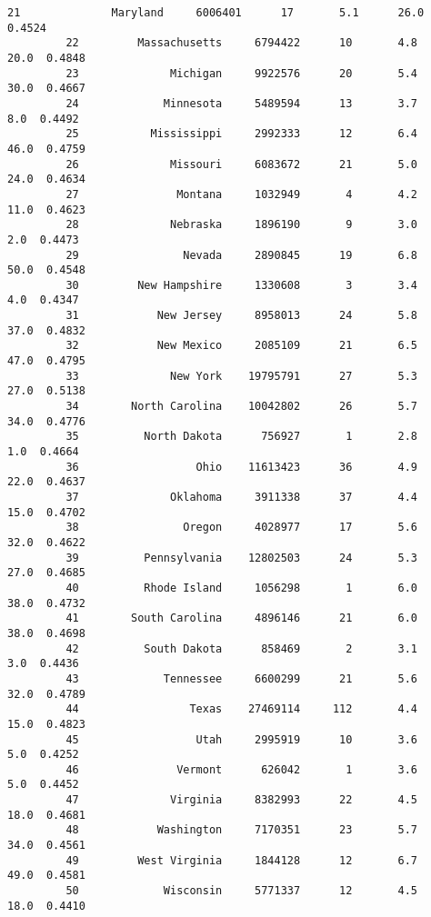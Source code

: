 \documentclass[11pt]{article}
\begin{document}
\begin{Verbatim}[commandchars=\\\{\}]
         21              Maryland     6006401      17       5.1      26.0  0.4524   
         22         Massachusetts     6794422      10       4.8      20.0  0.4848   
         23              Michigan     9922576      20       5.4      30.0  0.4667   
         24             Minnesota     5489594      13       3.7       8.0  0.4492   
         25           Mississippi     2992333      12       6.4      46.0  0.4759   
         26              Missouri     6083672      21       5.0      24.0  0.4634   
         27               Montana     1032949       4       4.2      11.0  0.4623   
         28              Nebraska     1896190       9       3.0       2.0  0.4473   
         29                Nevada     2890845      19       6.8      50.0  0.4548   
         30         New Hampshire     1330608       3       3.4       4.0  0.4347   
         31            New Jersey     8958013      24       5.8      37.0  0.4832   
         32            New Mexico     2085109      21       6.5      47.0  0.4795   
         33              New York    19795791      27       5.3      27.0  0.5138   
         34        North Carolina    10042802      26       5.7      34.0  0.4776   
         35          North Dakota      756927       1       2.8       1.0  0.4664   
         36                  Ohio    11613423      36       4.9      22.0  0.4637   
         37              Oklahoma     3911338      37       4.4      15.0  0.4702   
         38                Oregon     4028977      17       5.6      32.0  0.4622   
         39          Pennsylvania    12802503      24       5.3      27.0  0.4685   
         40          Rhode Island     1056298       1       6.0      38.0  0.4732   
         41        South Carolina     4896146      21       6.0      38.0  0.4698   
         42          South Dakota      858469       2       3.1       3.0  0.4436   
         43             Tennessee     6600299      21       5.6      32.0  0.4789   
         44                 Texas    27469114     112       4.4      15.0  0.4823   
         45                  Utah     2995919      10       3.6       5.0  0.4252   
         46               Vermont      626042       1       3.6       5.0  0.4452   
         47              Virginia     8382993      22       4.5      18.0  0.4681   
         48            Washington     7170351      23       5.7      34.0  0.4561   
         49         West Virginia     1844128      12       6.7      49.0  0.4581   
         50             Wisconsin     5771337      12       4.5      18.0  0.4410   
         

\end{Verbatim}
\end{document}
